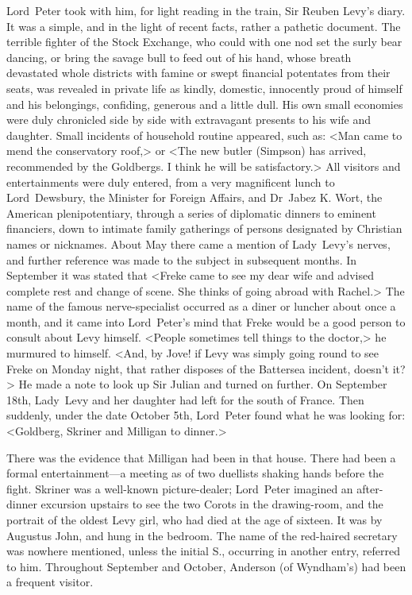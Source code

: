 Lord~Peter took with him, for light reading in the train, Sir Reuben Levy's diary. It was a simple, and in the light of recent facts, rather a pathetic document. The terrible fighter of the Stock Exchange, who could with one nod set the surly bear dancing, or bring the savage bull to feed out of his hand, whose breath devastated whole districts with famine or swept financial potentates from their seats, was revealed in private life as kindly, domestic, innocently proud of himself and his belongings, confiding, generous and a little dull. His own small economies were duly chronicled side by side with extravagant presents to his wife and daughter. Small incidents of household routine appeared, such as: <Man came to mend the conservatory roof,> or <The new butler (Simpson) has arrived, recommended by the Goldbergs. I think he will be satisfactory.> All visitors and entertainments were duly entered, from a very magnificent lunch to Lord~Dewsbury, the Minister for Foreign Affairs, and Dr~Jabez K\@. Wort, the American plenipotentiary, through a series of diplomatic dinners to eminent financiers, down to intimate family gatherings of persons designated by Christian names or nicknames. About May there came a mention of Lady~Levy's nerves, and further reference was made to the subject in subsequent months. In September it was stated that <Freke came to see my dear wife and advised complete rest and change of scene. She thinks of going abroad with Rachel.> The name of the famous nerve-specialist occurred as a diner or luncher about once a month, and it came into Lord~Peter's mind that Freke would be a good person to consult about Levy himself. <People sometimes tell things to the doctor,> he murmured to himself. <And, by Jove! if Levy was simply going round to see Freke on Monday night, that rather disposes of the Battersea incident, doesn't it?> He made a note to look up Sir Julian and turned on further. On September 18th, Lady~Levy and her daughter had left for the south of France. Then suddenly, under the date October 5th, Lord~Peter found what he was looking for: <Goldberg, Skriner and Milligan to dinner.>

There was the evidence that Milligan had been in that house. There had been a formal entertainment—a meeting as of two duellists shaking hands before the fight. Skriner was a well-known picture-dealer; Lord~Peter imagined an after-dinner excursion upstairs to see the two Corots in the drawing-room, and the portrait of the oldest Levy girl, who had died at the age of sixteen. It was by Augustus John, and hung in the bedroom. The name of the red-haired secretary was nowhere mentioned, unless the initial S\@., occurring in another entry, referred to him. Throughout September and October, Anderson (of Wyndham's) had been a frequent visitor.


